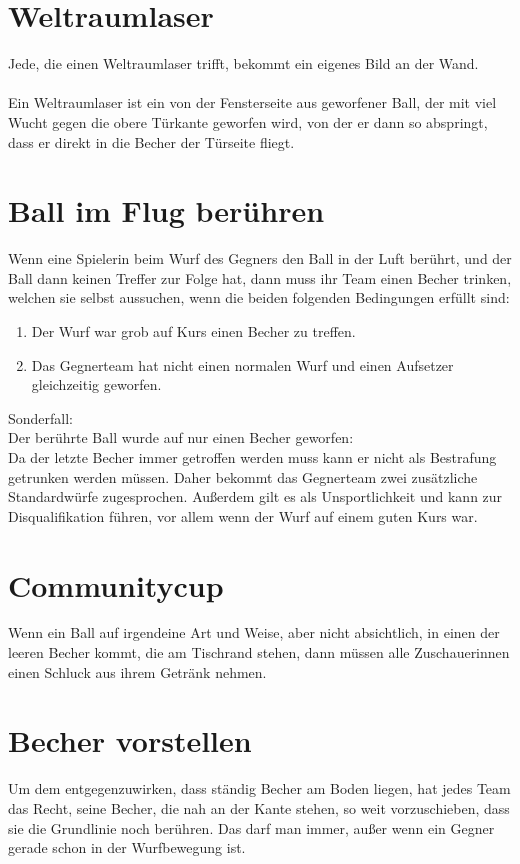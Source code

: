 \documentclass[a5paper, 12pt]{book}
\begin{document}
\section{Weltraumlaser}\label{sec:weltraumlaser}
Jede, die einen Weltraumlaser trifft, bekommt ein eigenes Bild an der Wand. \\\\ Ein Weltraumlaser ist ein von der Fensterseite aus geworfener Ball, der mit viel Wucht gegen die obere Türkante geworfen wird, von der er dann so abspringt, dass er direkt in die Becher der Türseite fliegt. 
\section{Ball im Flug berühren}\label{sec:ballimflugberühren}
Wenn eine Spielerin beim Wurf des Gegners den Ball in der Luft berührt, und der Ball dann keinen Treffer zur Folge hat, dann muss ihr Team einen Becher trinken, welchen sie selbst aussuchen, wenn die beiden folgenden Bedingungen erfüllt sind:
\begin{enumerate}[(1)]
    \item Der Wurf war grob auf Kurs einen Becher zu treffen.
    \item Das Gegnerteam hat nicht einen normalen Wurf und einen Aufsetzer gleichzeitig geworfen.
\end{enumerate}

Sonderfall: \\Der berührte Ball wurde auf nur einen Becher geworfen:\\
	Da der letzte Becher immer getroffen werden muss kann er nicht als Bestrafung getrunken werden müssen. Daher bekommt das Gegnerteam zwei zusätzliche Standardwürfe zugesprochen. 
Außerdem gilt es als Unsportlichkeit und kann zur Disqualifikation führen, vor allem wenn der Wurf auf einem guten Kurs war.

\section{Communitycup}\label{sec:communitycup}
Wenn ein Ball auf irgendeine Art und Weise, aber nicht absichtlich, in einen der leeren Becher kommt, die am Tischrand stehen, dann müssen alle Zuschauerinnen einen Schluck aus ihrem Getränk nehmen.
\section{Becher vorstellen}\label{sec:bechervorstellen}
Um dem entgegenzuwirken, dass ständig Becher am Boden liegen, hat jedes Team das Recht, seine Becher, die nah an der Kante stehen, so weit vorzuschieben, dass sie die Grundlinie noch berühren. 
Das darf man immer, außer wenn ein Gegner gerade schon in der Wurfbewegung ist. 
\end{document}
